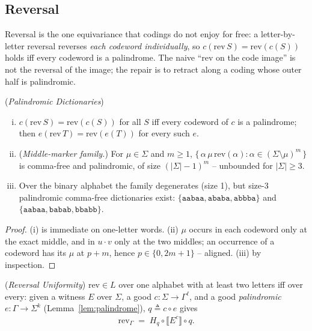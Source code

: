 \documentclass[runningheads,envcountsect]{llncs}
\begin{document}
\subsection{Reversal}

Reversal is the one equivariance that codings do not enjoy for free: a letter-by-letter reversal reverses \emph{each codeword individually}, so $c(\mathrm{rev}\,S) = \mathrm{rev}(c(S))$ holds iff every codeword is a palindrome. The naive ``rev on the code image'' is not the reversal of the image; the repair is to retract along a coding whose outer half is palindromic.

\begin{lemma}
    (\emph{Palindromic Dictionaries})
    \label{lem:palindrome}
    \begin{enumerate}[(i)]
        \item $c(\mathrm{rev}\,S) = \mathrm{rev}(c(S))$ for all $S$ iff every codeword of $c$ is a palindrome; then $e(\mathrm{rev}\,T) = \mathrm{rev}(e(T))$ for every such $e$.
        \item (\emph{Middle-marker family.}) For $\mu \in \Sigma$ and $m \geq 1$, $\{\, \alpha\,\mu\,\mathrm{rev}(\alpha) : \alpha \in (\Sigma \setminus \mu)^m \,\}$ is comma-free and palindromic, of size $(|\Sigma|-1)^m$ -- unbounded for $|\Sigma| \geq 3$.
        \item Over the binary alphabet the family degenerates (size 1), but size-3 palindromic comma-free dictionaries exist: $\{\mathtt{aabaa}, \mathtt{ababa}, \mathtt{abbba}\}$ and $\{\mathtt{aabaa}, \mathtt{babab}, \mathtt{bbabb}\}$.
    \end{enumerate}
\end{lemma}

\begin{proof}
    (i) is immediate on one-letter words. (ii) $\mu$ occurs in each codeword only at the exact middle, and in $u \cdot v$ only at the two middles; an occurrence of a codeword has its $\mu$ at $p + m$, hence $p \in \{0, 2m+1\}$ -- aligned. (iii) by inspection.
\end{proof}

\begin{theorem}
    (\emph{Reversal Uniformity})
    \label{thm:rev-uniform}
    $\mathrm{rev} \in L$ over one alphabet with at least two letters iff over every: given a witness $E$ over $\Sigma$, a good $c : \Sigma \rightarrow \Gamma^\ell$, and a good \emph{palindromic} $e : \Gamma \rightarrow \Sigma^k$ (Lemma~\ref{lem:palindrome}), $q \triangleq c \circ e$ gives
    \begin{align}
        \mathrm{rev}_\Gamma \;=\; H_q \circ \llbracket E^c \rrbracket \circ q .
    \end{align}
\end{theorem}
\end{document}
